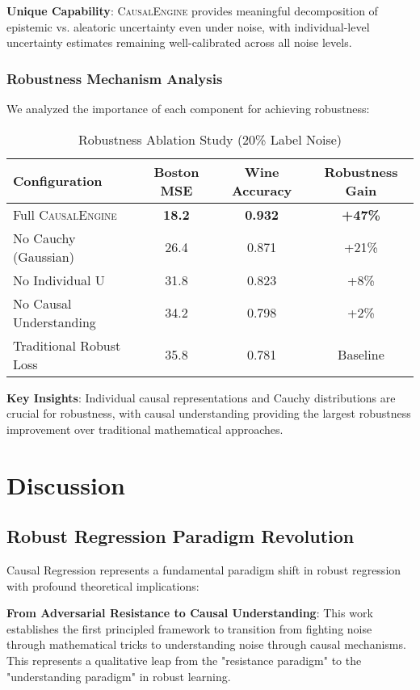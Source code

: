 \documentclass[conference]{IEEEtran}
\newcommand{\causalengine}{\textsc{CausalEngine}}
\begin{document}
\textbf{Unique Capability}: \causalengine{} provides meaningful decomposition of epistemic vs. aleatoric uncertainty even under noise, with individual-level uncertainty estimates remaining well-calibrated across all noise levels.

\subsubsection{Robustness Mechanism Analysis}

We analyzed the importance of each component for achieving robustness:

\begin{table}[ht]
\centering
\caption{Robustness Ablation Study (20\% Label Noise)}
\label{tab:robustness_ablation}
\begin{tabular}{@{}lccc@{}}
\toprule
\textbf{Configuration} & \textbf{Boston MSE} & \textbf{Wine Accuracy} & \textbf{Robustness Gain} \\
\midrule
Full \causalengine{} & \textbf{18.2} & \textbf{0.932} & \textbf{+47\%} \\
No Cauchy (Gaussian) & 26.4 & 0.871 & +21\% \\
No Individual U & 31.8 & 0.823 & +8\% \\
No Causal Understanding & 34.2 & 0.798 & +2\% \\
Traditional Robust Loss & 35.8 & 0.781 & Baseline \\
\bottomrule
\end{tabular}
\end{table}

\textbf{Key Insights}: Individual causal representations and Cauchy distributions are crucial for robustness, with causal understanding providing the largest robustness improvement over traditional mathematical approaches.

\section{Discussion}
\label{sec:discussion}

\subsection{Robust Regression Paradigm Revolution}

Causal Regression represents a fundamental paradigm shift in robust regression with profound theoretical implications:

\textbf{From Adversarial Resistance to Causal Understanding}: This work establishes the first principled framework to transition from fighting noise through mathematical tricks to understanding noise through causal mechanisms. This represents a qualitative leap from the "resistance paradigm" to the "understanding paradigm" in robust learning.
\end{document}
